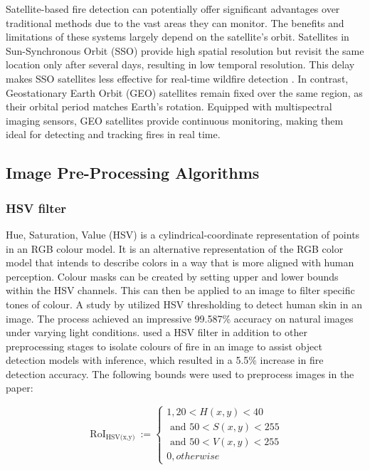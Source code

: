 \documentclass[lettersize,journal]{IEEEtran}
\begin{document}
Satellite-based fire detection can potentially offer significant
advantages over traditional methods due to the vast areas they can
monitor. The benefits and limitations of these systems largely depend on
the satellite's orbit. Satellites in Sun-Synchronous Orbit (SSO) provide
high spatial resolution but revisit the same location only after several
days, resulting in low temporal resolution. This delay makes SSO
satellites less effective for real-time wildfire detection
\cite{satellite}. In contrast, Geostationary Earth Orbit (GEO) satellites
remain fixed over the same region, as their orbital period matches
Earth's rotation. Equipped with multispectral imaging sensors, GEO
satellites provide continuous monitoring, making them ideal for
detecting and tracking fires in real time.

\subsection{Image Pre-Processing Algorithms}

\subsubsection{HSV filter}

Hue, Saturation, Value (HSV) is a cylindrical-coordinate representation
of points in an RGB colour model. It is an alternative representation of
the RGB color model that intends to describe colors in a way that is
more aligned with human perception. Colour masks can be created by
setting upper and lower bounds within the HSV channels. This can then be
applied to an image to filter specific tones of colour. A study by
\cite{skinhsv} utilized HSV thresholding to detect human skin in an
image. The process achieved an impressive 99.587\% accuracy on natural
images under varying light conditions. \cite{prepfire} used a HSV filter
in addition to other preprocessing stages to isolate colours of fire in
an image to assist object detection models with inference, which
resulted in a 5.5\% increase in fire detection accuracy. The following
bounds were used to preprocess images in the paper:

\[\text{ RoI}_{\text{HSV(x,y) }} := \begin{cases}
        1, 20 < H(x,y) < 40 \\
        \text{ and }50 < S(x,y) < 255 \\
        \text{ and }50 < V(x,y) < 255 \\
        0, otherwise
\end{cases}\]
\end{document}
